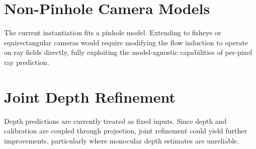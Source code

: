 \section{Non-Pinhole Camera Models}

The current instantiation fits a pinhole model. Extending to fisheye or equirectangular cameras would require modifying the flow induction to operate on ray fields directly, fully exploiting the model-agnostic capabilities of per-pixel ray prediction.

\section{Joint Depth Refinement}

Depth predictions are currently treated as fixed inputs. Since depth and calibration are coupled through projection, joint refinement could yield further improvements, particularly where monocular depth estimates are unreliable.
